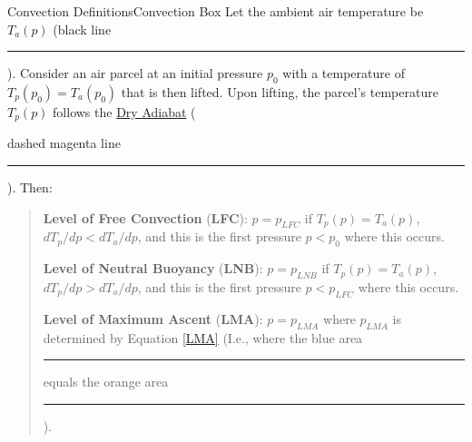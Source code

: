 \begin{fact}{Convection Definitions}{Convection Box}\label{Convection Box}
    Let the ambient air temperature be \(T_a(p)\) (black line \textcolor{black}{\rule{0.25cm}{0.25cm}}). Consider an air parcel at an initial pressure \(p_0\) with a temperature of \(T_p(p_0)=T_a(p_0)\) that is then lifted. Upon lifting, the parcel's temperature \(T_p(p)\) follows the \hyperref[Dry Adiabat]{Dry Adiabat} (\textcolor{mymagenta}{dashed magenta line \rule{0.25cm}{0.25cm}}). Then:
    \begin{quote}
        \textbf{Level of Free Convection} (\textbf{LFC}): \(p=p_{LFC}\) if \(T_p(p)=T_a(p)\), \(dT_p/dp<dT_a/dp\), and this is the first pressure \(p<p_0\) where this occurs.

        \textbf{Level of Neutral Buoyancy} (\textbf{LNB}): \(p=p_{LNB}\) if \(T_p(p)=T_a(p)\), \(dT_p/dp>dT_a/dp\), and this is the first pressure \(p<p_{LFC}\) where this occurs.

        \textbf{Level of Maximum Ascent} (\textbf{LMA}): \(p=p_{LMA}\) where \(p_{LMA}\) is determined by Equation \ref{LMA} (I.e., where the blue area \textcolor{mydarkblue}{\rule{0.25cm}{0.25cm}} equals the orange area \textcolor{myorange}{\rule{0.25cm}{0.25cm}}).
    \end{quote}


\end{fact}
